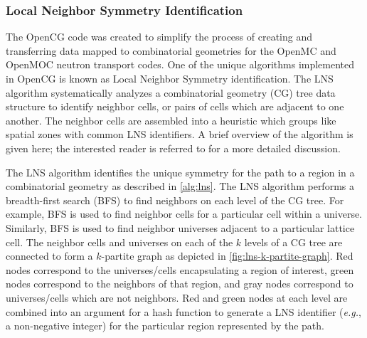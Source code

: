 \subsubsection{Local Neighbor Symmetry Identification}
\label{subsubsec:homogenize-lns}

The OpenCG code \citep{boyd2015opencg} was created to simplify the process of creating and transferring data mapped to combinatorial geometries for the OpenMC \citep{romano2013openmc} and OpenMOC \citep{boyd2014openmoc} neutron transport codes. One of the unique algorithms implemented in OpenCG is known as Local Neighbor Symmetry identification. The LNS algorithm systematically analyzes a combinatorial geometry (CG) tree data structure to identify neighbor cells, or pairs of cells which are adjacent to one another. The neighbor cells are assembled into a heuristic which groups like spatial zones with common LNS identifiers. A brief overview of the algorithm is given here; the interested reader is referred to \citep{boyd2015opencg} for a more detailed discussion.

The LNS algorithm identifies the unique symmetry for the path to a region in a combinatorial geometry as described in \autoref{alg:lns}. The LNS algorithm performs a breadth-first search (BFS) to find neighbors on each level of the CG tree. For example, BFS is used to find neighbor cells for a particular cell within a universe. Similarly, BFS is used to find neighbor universes adjacent to a particular lattice cell. The neighbor cells and universes on each of the $k$ levels of a CG tree are connected to form a $k$-partite graph as depicted in \autoref{fig:lns-k-partite-graph}. Red nodes correspond to the universes/cells encapsulating a region of interest, green nodes correspond to the neighbors of that region, and gray nodes correspond to universes/cells which are not neighbors. Red and green nodes at each level are combined into an argument for a hash function to generate a LNS identifier (\textit{e.g.}, a non-negative integer) for the particular region represented by the path.

